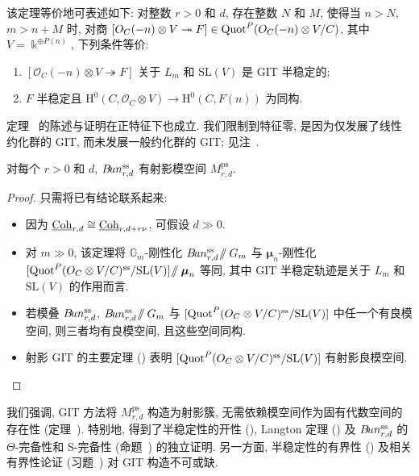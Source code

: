 \begin{remark}\label{src:9.5.2}
该定理等价地可表述如下: 对整数 $r>0$ 和 $d$, 存在整数 $N$ 和 $M$, 使得当 $n>N$, $m>n+M$ 时, 对商 $[O_C(-n)\otimes V\twoheadrightarrow F]\in\operatorname{Quot}^P(O_C(-n)\otimes V/C)$, 其中 $V=\Bbbk^{\oplus P(n)}$, 下列条件等价:
\begin{enumerate}[(1)]
\item $[\mathcal O_C(-n)\otimes V\twoheadrightarrow F]$ 关于 $L_m$ 和 $\mathrm{SL}(V)$ 是 GIT 半稳定的;
\item $F$ 半稳定且 $\mathrm H^0(C,\mathcal O_C\otimes V)\to\mathrm H^0(C,F(n))$ 为同构.
\end{enumerate}
\end{remark}
\begin{remark}\label{src:9.5.3}
定理~ 的陈述与证明在正特征下也成立. 我们限制到特征零, 是因为仅发展了线性约化群的 GIT, 而未发展一般约化群的 GIT; 见注~.
\end{remark}
\begin{corollary}\label{src:9.5.4}
对每个 $r>0$ 和 $d$, $B\!un_{r,d}^{\mathrm{ss}}$ 有射影模空间 $M_{r,d}^{\mathrm{ps}}$.
\end{corollary}
\begin{proof}
只需将已有结论联系起来:
\begin{itemize}
\item 因为 $\underline{\mathrm{Coh}}_{r,d}\cong\underline{\mathrm{Coh}}_{r,d+r\nu}$, 可假设 $d\gg0$.
\item 对 $m\gg0$, 该定理将 $\mathbb G_m$-刚性化 $B\!un_{r,d}^{\mathrm{ss}}\!\mathbin{/\mkern-6mu/}G_m$ 与 $\boldsymbol\mu_n$-刚性化 $[\operatorname{Quot}^P(O_C\otimes V/C)^{\mathrm{ss}}/\mathrm{SL}(V)]\!\mathbin{/\mkern-6mu/}\boldsymbol\mu_n$ 等同, 其中 GIT 半稳定轨迹是关于 $L_m$ 和 $\mathrm{SL}(V)$ 的作用而言.
\item 若模叠 $B\!un_{r,d}^{\mathrm{ss}}$, $B\!un_{r,d}^{\mathrm{ss}}\!\mathbin{/\mkern-6mu/}G_m$ 与 $[\operatorname{Quot}^P(O_C\otimes V/C)^{\mathrm{ss}}/\mathrm{SL}(V)]$ 中任一个有良模空间, 则三者均有良模空间, 且这些空间同构.
\item 射影 GIT 的主要定理 () 表明 $[\operatorname{Quot}^P(O_C\otimes V/C)^{\mathrm{ss}}/\mathrm{SL}(V)]$ 有射影良模空间.
\end{itemize}
\end{proof}
我们强调, GIT 方法将 $M_{r,d}^{\mathrm{ps}}$ 构造为射影簇, 无需依赖模空间作为固有代数空间的存在性 (定理~). 特别地, 得到了半稳定性的开性 (), Langton 定理 () 及 $B\!un_{r,d}^{\mathrm{ss}}$ 的 $\Theta$-完备性和 S-完备性 (命题~) 的独立证明. 另一方面, 半稳定性的有界性 () 及相关有界性论证 (习题~) 对 GIT 构造不可或缺.

